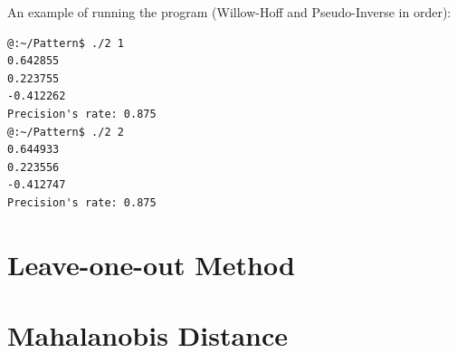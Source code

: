 \documentclass[a4paper, 11pt]{article}
\begin{document}
An example of running the program (Willow-Hoff and Pseudo-Inverse in order):
\begin{verbatim}
@:~/Pattern$ ./2 1
0.642855
0.223755
-0.412262
Precision's rate: 0.875
@:~/Pattern$ ./2 2
0.644933
0.223556
-0.412747
Precision's rate: 0.875
\end{verbatim}

\section{Leave-one-out Method}

\section{Mahalanobis Distance}
\end{document}
